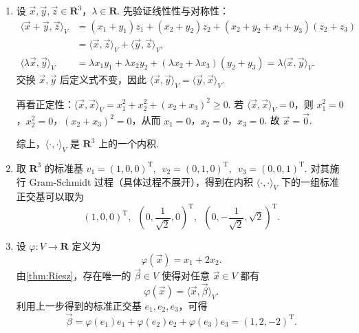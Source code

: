 \begin{solution}
    \begin{enumerate}
        \item 设 $\vec{x}, \vec{y}, \vec{z} \in \mathbf{R}^3$，$\lambda \in \mathbf{R}$. 先验证线性性与对称性：
        \begin{align*}
            \langle \vec{x} + \vec{y}, \vec{z} \rangle_V
             & = (x_1 + y_1)z_1 + (x_2 + y_2)z_2 + (x_2 + y_2 + x_3 + y_3)(z_2 + z_3) \\
             & = \langle \vec{x}, \vec{z} \rangle_V + \langle \vec{y}, \vec{z} \rangle_V, \\
            \langle \lambda \vec{x}, \vec{y} \rangle_V
             & = \lambda x_1 y_1 + \lambda x_2 y_2 + (\lambda x_2 + \lambda x_3)(y_2 + y_3)
            = \lambda \langle \vec{x}, \vec{y} \rangle_V.
        \end{align*}
        交换 $\vec{x}, \vec{y}$ 后定义式不变，因此 $\langle \vec{x}, \vec{y} \rangle_V = \langle \vec{y}, \vec{x} \rangle_V$.

        再看正定性：$\langle \vec{x}, \vec{x} \rangle_V = x_1^2 + x_2^2 + (x_2 + x_3)^2 \geqslant 0$. 若 $\langle \vec{x}, \vec{x} \rangle_V = 0$，则 $x_1^2 = 0$，$x_2^2 = 0$，$(x_2 + x_3)^2 = 0$，从而 $x_1 = 0$，$x_2 = 0$，$x_3 = 0$. 故 $\vec{x} = \vec{0}$.

        综上，$\langle \cdot, \cdot \rangle_V$ 是 $\mathbf{R}^3$ 上的一个内积.

        \item 取 $\mathbf{R}^3$ 的标准基 $v_1 = (1, 0, 0)^{\mathrm{T}}, \enspace v_2 = (0, 1, 0)^{\mathrm{T}}, \enspace v_3 = (0, 0, 1)^{\mathrm{T}}$.
        对其施行 Gram-Schmidt 过程（具体过程不展开），得到在内积 $\langle \cdot, \cdot \rangle_V$ 下的一组标准正交基可以取为
        \[
            \left(1, 0, 0\right)^{\mathrm{T}}, \enspace \left(0, \frac{1}{\sqrt{2}}, 0\right)^{\mathrm{T}}, \enspace \left(0, -\frac{1}{\sqrt{2}}, \sqrt{2}\right)^{\mathrm{T}}.
        \]

        \item 设 $\varphi \colon V \to \mathbf{R}$ 定义为
        \[
            \varphi(\vec{x}) = x_1 + 2x_2.
        \]
        由\autoref{thm:Riesz}，存在唯一的 $\vec{\beta} \in V$ 使得对任意 $\vec{x} \in V$ 都有
        \[
            \varphi(\vec{x}) = \langle \vec{x}, \vec{\beta} \rangle_V.
        \]
        利用上一步得到的标准正交基 $e_1, e_2, e_3$，可得
        \[
            \vec{\beta} = \varphi(e_1)e_1 + \varphi(e_2)e_2 + \varphi(e_3)e_3 = (1, 2, -2)^{\mathrm{T}}.
        \]
    \end{enumerate}
\end{solution}

